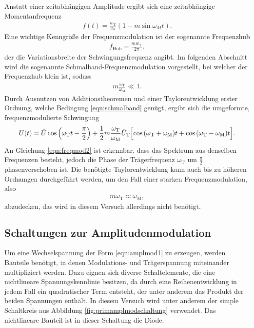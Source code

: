 Anstatt einer zeitabhängigen Amplitude ergibt sich eine zeitabhängige Momentanfrequenz
\begin{align}
  f(t) = \frac{w_\text{T}}{2 \pi} (1 - m \sin{\omega_M t}).
  \label{eqn:momentanfreq}
\end{align}
Eine wichtige Kenngröße der Frequenzmodulation ist der sogenannte Frequenzhub
\begin{align}
  f_\text{Hub} = \frac{m w_\text{T}}{2 \pi},
  \label{eqn:frequenzhub}
\end{align}
der die Variationsbreite der Schwingungsfrequenz angibt.
Im folgenden Abschnitt wird die sogenannte Schmalband-Frequenzmodulation vorgestellt,
bei welcher der Frequenzhub klein ist, sodass
\begin{align}
  m \frac{\omega_\text{T}}{\omega_\text{M}} \ll 1.
  \label{eqn:schmalband}
\end{align}
Durch Ausnutzen von Additionstheoremen und einer Taylorentwicklung erster Ordnung, welche
Bedingung \eqref{eqn:schmalband} genügt, ergibt sich die umgeformte, frequenzmodulierte Schwingung
\begin{align}
  U(t) = \hat{U} \cos{\Bigl(\omega_\text{T} t - \frac{\pi}{2}\Bigr)} + \frac12 m \frac{\omega_\text{T}}{\omega_\text{M}}\hat{U}_\text{T} \Bigl[  \cos{(\omega_\text{T}+\omega_\text{M}) t} + \cos{(\omega_\text{T}-\omega_\text{M}) t} \Bigr].
  \label{eqn:freqmod2}
\end{align}
An Gleichung \eqref{eqn:freqmod2} ist erkennbar, dass das Spektrum aus denselben Frequenzen besteht, jedoch
die Phase der Trägerfrequenz $\omega_\text{T}$ um $\frac{\pi}{2}$ phasenverschoben ist.
Die benötigte Taylorentwicklung kann auch bis zu höheren Ordnungen durchgeführt werden, um den Fall einer starken
Frequenzmodulation, also
\begin{align}
  m \omega_\text{T} \approx \omega_\text{M},
\end{align}
abzudecken, das wird in diesem Versuch allerdings nicht benötigt.

\subsection{Schaltungen zur Amplitudenmodulation}
\label{sec:amplmodschaltung}

Um eine Wechselspannung der Form \eqref{eqn:amplmod1} zu erzeugen, werden Bauteile
benötigt, in denen Modulations- und Trägerspannung miteinander multipliziert werden.
Dazu eignen sich diverse Schaltelemente, die eine nichtlineare Spannungskennlinie besitzen,
da durch eine Reihenentwicklung in jedem Fall ein quadratischer Term entsteht, der
unter anderem das Produkt der beiden Spannungen enthält. In diesem Versuch wird unter
anderem der simple Schaltkreis aus Abbildung \ref{fig:primamplmodschaltung} verwendet. Das
nichtlineare Bauteil ist in dieser Schaltung die Diode.

